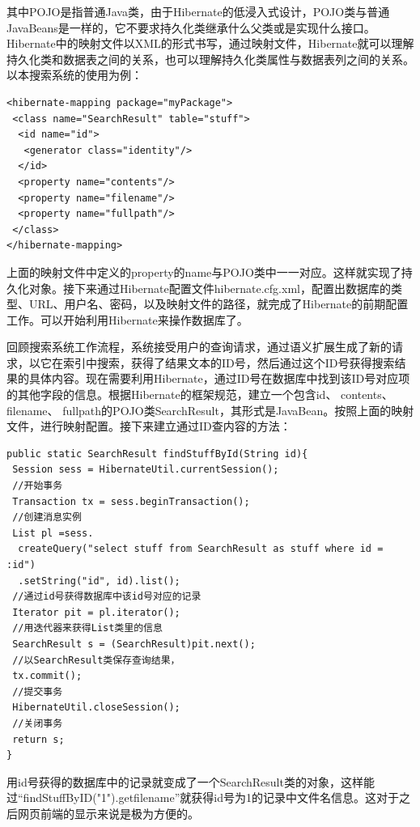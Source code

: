 \documentclass[12pt,a4paper]{article}
\begin{document}
	其中{\Times POJO}是指普通{\Times Java}类，由于{\Times Hibernate}的低浸入式设计，{\Times POJO}类与普通{\Times JavaBeans}是一样的，它不要求持久化类继承什么父类或是实现什么接口。{\Times Hibernate}中的映射文件以{\Times XML}的形式书写，通过映射文件，{\Times Hibernate}就可以理解持久化类和数据表之间的关系，也可以理解持久化类属性与数据表列之间的关系。以本搜索系统的使用为例：
	
\lstset{language=XML,frame=lines}
\begin{lstlisting}
<hibernate-mapping package="myPackage">
 <class name="SearchResult" table="stuff">
  <id name="id">
   <generator class="identity"/>
  </id>
  <property name="contents"/>
  <property name="filename"/>
  <property name="fullpath"/>
 </class>
</hibernate-mapping>
\end{lstlisting}	

	上面的映射文件中定义的{\Times property}的{\Times name}与{\Times POJO}类中一一对应。这样就实现了持久化对象。接下来通过{\Times Hibernate}配置文件{\Times hibernate.cfg.xml}，配置出数据库的类型、{\Times URL}、用户名、密码，以及映射文件的路径，就完成了{\Times Hibernate}的前期配置工作。可以开始利用{\Times Hibernate}来操作数据库了。
	
	回顾搜索系统工作流程，系统接受用户的查询请求，通过语义扩展生成了新的请求，以它在索引中搜索，获得了结果文本的{\Times ID}号，然后通过这个{\Times ID}号获得搜索结果的具体内容。现在需要利用Hibernate，通过{\Times ID}号在数据库中找到该{\Times ID}号对应项的其他字段的信息。根据{\Times Hibernate}的框架规范，建立一个包含{\Times id}、 {\Times contents}、 {\Times filename}、 {\Times fullpath}的{\Times POJO}类{\Times SearchResult}，其形式是{\Times JavaBean}。按照上面的映射文件，进行映射配置。接下来建立通过{\Times ID}查内容的方法：
	
\lstset{language=Java,frame=lines}
\begin{lstlisting}
public static SearchResult findStuffById(String id){
 Session sess = HibernateUtil.currentSession();
 //开始事务
 Transaction tx = sess.beginTransaction();
 //创建消息实例
 List pl =sess.
  createQuery("select stuff from SearchResult as stuff where id = :id")
  .setString("id", id).list();
 //通过id号获得数据库中该id号对应的记录
 Iterator pit = pl.iterator();
 //用迭代器来获得List类里的信息
 SearchResult s = (SearchResult)pit.next();
 //以SearchResult类保存查询结果，
 tx.commit();
 //提交事务
 HibernateUtil.closeSession();
 //关闭事务
 return s;
}
\end{lstlisting}	

	用{\Times id}号获得的数据库中的记录就变成了一个{\Times SearchResult}类的对象，这样能过“{\Times findStuffByID("1").getfilename}”就获得{\Times id}号为1的记录中文件名信息。这对于之后网页前端的显示来说是极为方便的。
	
\end{document}
